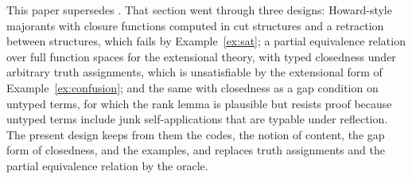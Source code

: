 \documentclass[10pt]{article}
\begin{document}
This paper supersedes \cite[\S8]{paper2}. That section went through
three designs: Howard-style majorants with closure functions computed in
cut structures and a retraction between structures, which fails by
Example~\ref{ex:sat}; a partial equivalence relation over full function
spaces for the extensional theory, with typed closedness under arbitrary
truth assignments, which is unsatisfiable by the extensional form of
Example~\ref{ex:confusion}; and the same with closedness as a gap
condition on untyped terms, for which the rank lemma is plausible but
resists proof because untyped terms include junk self-applications that
are typable under reflection. The present design keeps from them the
codes, the notion of content, the gap form of closedness, and the
examples, and replaces truth assignments and the partial equivalence
relation by the oracle.

{\small

}
\end{document}

